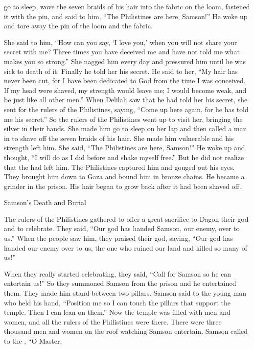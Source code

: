 {go to
sleep,
wove the seven braids of his hair into the fabric on the
loom, fastened
it with
the pin,
and said
to him,
“The Philistines
are here, Samson!” He woke
up and tore away the pin
of the
loom
and the
fabric.
\par }{\PP {}She said
to him,
“How
can you say,
‘I love
you,’ when you will not
share your secret
with
me? Three
times
you have deceived
me and have not
told
me what
makes
you so strong.”
She nagged
him every
day
and pressured
him until he was sick to death of it.
Finally he told
her his secret.
He said
to her, “My hair
has never
been cut,
for
I have been dedicated
to God
from the time I
was conceived.
If
my head were shaved,
my strength
would leave
me; I would become weak,
and be
just like all
other men.”
When Delilah
saw
that
he had told
her his secret,
she sent
for the rulers
of the Philistines,
saying,
“Come up
here again,
for
he has told
me
his secret.”
So
the rulers
of the Philistines
went up
to
visit her, bringing the silver
in their hands.
She made him go to sleep
on
her lap
and then called
a man
in to shave
off the seven
braids
of his hair.
She made him vulnerable
and his strength
left him.
She said,
“The Philistines
are here, Samson!” He woke up
and thought, “I will do
as I did before
and shake
myself free.”
But he did not
realize
that
the {}
had left him.
The Philistines
captured
him and gouged out
his eyes.
They brought
him down
to Gaza
and bound
him in bronze
chains. He became
a grinder
in the prison.
His hair
began
to grow
back after it had
been shaved off.
\par }{\SH Samson’s Death and Burial
\par }{\PP {}The rulers
of the Philistines
gathered
to offer
a great
sacrifice
to Dagon
their god
and to celebrate.
They said,
“Our god
has handed
Samson,
our enemy, over to us.”
When
the people
saw him, they praised
their god,
saying,
“Our god
has handed
our enemy
over to us, the one who ruined
our land
and killed
so many of us!”
\par }{\PP {}When
they really
started celebrating,
they said,
“Call
for Samson
so he can entertain
us!” So they summoned
Samson
from the prison
and he entertained them. They made him stand
between
two pillars.
Samson
said
to
the young man
who held
his hand,
“Position
me so I can touch
the pillars
that
support
the temple.
Then I can lean
on them.”
Now the temple
was filled
with men
and women,
and all
the rulers
of the Philistines
were there. There
were three
thousand
men
and women
on the roof
watching
Samson
entertain.
Samson
called
to
the
{}, “O Master,

}
